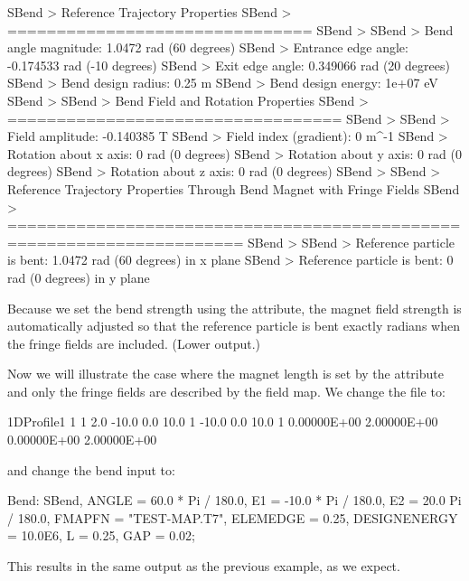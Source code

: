 \begin{example}
SBend > Reference Trajectory Properties
SBend > ===============================
SBend >
SBend > Bend angle magnitude:    1.0472 rad (60 degrees)
SBend > Entrance edge angle:     -0.174533 rad (-10 degrees)
SBend > Exit edge angle:         0.349066 rad (20 degrees)
SBend > Bend design radius:      0.25 m
SBend > Bend design energy:      1e+07 eV
SBend >
SBend > Bend Field and Rotation Properties
SBend > ==================================
SBend >
SBend > Field amplitude:         -0.140385 T
SBend > Field index (gradient):  0 m^-1
SBend > Rotation about x axis:   0 rad (0 degrees)
SBend > Rotation about y axis:   0 rad (0 degrees)
SBend > Rotation about z axis:   0 rad (0 degrees)
SBend >
SBend > Reference Trajectory Properties Through Bend Magnet with Fringe Fields
SBend > ======================================================================
SBend >
SBend > Reference particle is bent: 1.0472 rad (60 degrees) in x plane
SBend > Reference particle is bent: 0 rad (0 degrees) in y plane
\end{example}
Because we set the bend strength using the  attribute, the magnet field strength is automatically
adjusted so that the reference particle is bent exactly  radians when the fringe fields are included.
(Lower output.)

Now we will illustrate the case where the magnet length is set by the  attribute and only the fringe
fields are described by the field map. We change the  file to:
\begin{example}
1DProfile1 1 1 2.0
 -10.0  0.0  10.0 1
 -10.0  0.0  10.0 1
  0.00000E+00
  2.00000E+00
  0.00000E+00
  2.00000E+00
\end{example}
and change the bend input to:

\begin{example}
Bend: SBend, ANGLE = 60.0 * Pi / 180.0,
             E1 = -10.0 * Pi / 180.0,
             E2 = 20.0  Pi / 180.0,
	     FMAPFN = "TEST-MAP.T7",
	     ELEMEDGE = 0.25,
	     DESIGNENERGY = 10.0E6,
             L = 0.25,
	     GAP = 0.02;
\end{example}
This results in the same output as the previous example, as we expect.

